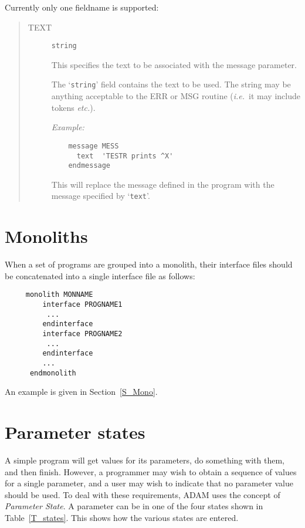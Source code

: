 Currently only one fieldname is supported:
\begin{quote}
\begin{description}
\item [TEXT] {\tt string}

This specifies the text to be associated with the message parameter.

The `\verb+string+' field contains the text to be used.
The string may be anything acceptable to the ERR or MSG routine ({\em i.e.}\,
it may include tokens {\em etc.}).

{\em Example:}

\begin{small}
\begin{verbatim}
    message MESS
      text  'TESTR prints ^X'
    endmessage
\end{verbatim}
\end{small}

This will replace the message defined in the program with the message specified
by `\verb+text+'.
\end{description}
\end{quote}

\section{Monoliths}

When a set of programs are grouped into a monolith, their interface files
should be concatenated into a single interface file as follows:

\begin{small}
\begin{verbatim}
     monolith MONNAME
         interface PROGNAME1
          ...
         endinterface
         interface PROGNAME2
          ...
         endinterface
         ...
      endmonolith
\end{verbatim}
\end{small}

An example is given in Section~\ref{S_Mono}.

\section{Parameter states}

A simple program will get values for its parameters, do something with them,
and then finish.
However, a programmer may wish to obtain a sequence of values for a single
parameter, and a user may wish to indicate that no parameter value should
be used.
To deal with these requirements, ADAM uses the concept of {\em Parameter State}.
A parameter can be in one of the four states shown in Table~\ref{T_states}.
This shows how the various states are entered.

